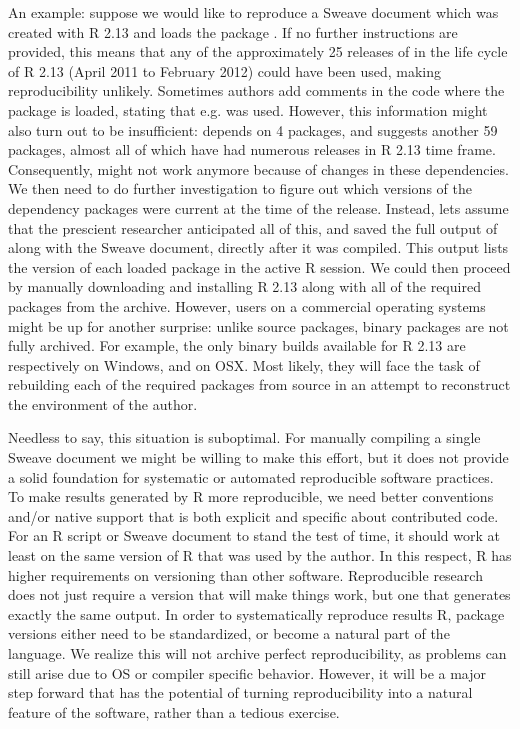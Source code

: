 An example: suppose we would like to reproduce a Sweave document which was
created with R 2.13 and loads the  package \citep{caret}. If no further
instructions are provided, this means that any of the approximately 25 releases
of  in the life cycle of R 2.13 (April 2011 to February 2012) could
have been used, making reproducibility unlikely. Sometimes authors add comments
in the code where the package is loaded, stating that e.g.  was
used. However, this information might also turn out to be insufficient:
 depends on 4 packages, and suggests another 59 packages, almost all of which
have had numerous releases in R 2.13 time frame.
Consequently,  might not work anymore because of changes in
these dependencies. We then need to do further investigation to figure out
which versions of the dependency packages were current at the time of the
 release. Instead, lets assume that the prescient researcher
anticipated all of this, and saved the full output of 
along with the Sweave document, directly after it was compiled. This output
lists the version of each loaded package in the active R session.
We could then proceed by manually downloading and installing R 2.13 along with
all of the required packages from the archive. However, users on a commercial
operating systems might be up for another surprise: unlike source packages,
binary packages are not fully archived. For example, the only binary builds
available for R 2.13 are respectively  on Windows, and
 on OSX. Most likely, they will face the task of rebuilding
each of the required packages from source in an attempt to reconstruct the
environment of the author.

Needless to say, this situation is suboptimal. For manually compiling a single
Sweave document we might be willing to make this effort, but it does not
provide a solid foundation for systematic or automated reproducible software
practices. To make results generated by R more reproducible, we need better
conventions and/or native support that is both explicit and specific about
contributed code. For an R script or Sweave document to stand the test of time,
it should work at least on the same version of R that was used by the author. In
this respect, R has higher requirements on versioning than other software.
Reproducible research does not just require a version that will
make things work, but one that generates exactly the same output. In
order to systematically reproduce results R, package versions either need to be
standardized, or become a natural part of the language. We realize this will
not archive perfect reproducibility, as problems can still arise due to OS or
compiler specific behavior. However, it will be a major step forward that has
the potential of turning reproducibility into a natural feature of the
software, rather than a tedious exercise.
 
